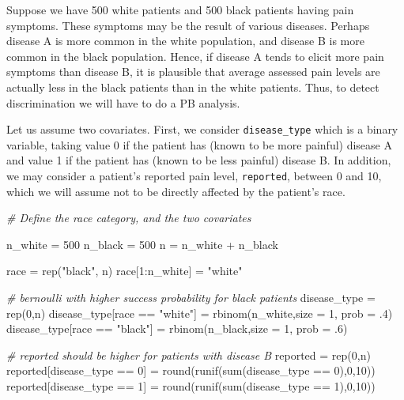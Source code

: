 \documentclass[
]{article}
\newenvironment{Shaded}{\begin{snugshade}}{\end{snugshade}}
\newcommand{\AttributeTok}[1]{\textcolor[rgb]{0.77,0.63,0.00}{#1}}
\newcommand{\CommentTok}[1]{\textcolor[rgb]{0.56,0.35,0.01}{\textit{#1}}}
\newcommand{\DecValTok}[1]{\textcolor[rgb]{0.00,0.00,0.81}{#1}}
\newcommand{\FunctionTok}[1]{\textcolor[rgb]{0.00,0.00,0.00}{#1}}
\newcommand{\NormalTok}[1]{#1}
\newcommand{\OtherTok}[1]{\textcolor[rgb]{0.56,0.35,0.01}{#1}}
\newcommand{\SpecialCharTok}[1]{\textcolor[rgb]{0.00,0.00,0.00}{#1}}
\newcommand{\StringTok}[1]{\textcolor[rgb]{0.31,0.60,0.02}{#1}}
\begin{document}
Suppose we have 500 white patients and 500 black patients having pain
symptoms. These symptoms may be the result of various diseases. Perhaps
disease A is more common in the white population, and disease B is more
common in the black population. Hence, if disease A tends to elicit more
pain symptoms than disease B, it is plausible that average assessed pain
levels are actually less in the black patients than in the white
patients. Thus, to detect discrimination we will have to do a PB
analysis.

Let us assume two covariates. First, we consider \texttt{disease\_type}
which is a binary variable, taking value 0 if the patient has (known to
be more painful) disease A and value 1 if the patient has (known to be
less painful) disease B. In addition, we may consider a patient's
reported pain level, \texttt{reported}, between 0 and 10, which we will
assume not to be directly affected by the patient's race.

\begin{Shaded}
\begin{Highlighting}[]
\CommentTok{\# Define the race category, and the two covariates}

\NormalTok{n\_white }\OtherTok{=} \DecValTok{500}
\NormalTok{n\_black }\OtherTok{=} \DecValTok{500}
\NormalTok{n }\OtherTok{=}\NormalTok{ n\_white }\SpecialCharTok{+}\NormalTok{ n\_black}

\NormalTok{race }\OtherTok{=} \FunctionTok{rep}\NormalTok{(}\StringTok{"black"}\NormalTok{, n)}
\NormalTok{race[}\DecValTok{1}\SpecialCharTok{:}\NormalTok{n\_white] }\OtherTok{=} \StringTok{"white"}

\CommentTok{\# bernoulli with higher success probability for black patients}
\NormalTok{disease\_type }\OtherTok{=} \FunctionTok{rep}\NormalTok{(}\DecValTok{0}\NormalTok{,n)}
\NormalTok{disease\_type[race }\SpecialCharTok{==} \StringTok{"white"}\NormalTok{] }\OtherTok{=} \FunctionTok{rbinom}\NormalTok{(n\_white,}\AttributeTok{size =} \DecValTok{1}\NormalTok{, }\AttributeTok{prob =}\NormalTok{ .}\DecValTok{4}\NormalTok{)}
\NormalTok{disease\_type[race }\SpecialCharTok{==} \StringTok{"black"}\NormalTok{] }\OtherTok{=} \FunctionTok{rbinom}\NormalTok{(n\_black,}\AttributeTok{size =} \DecValTok{1}\NormalTok{, }\AttributeTok{prob =}\NormalTok{ .}\DecValTok{6}\NormalTok{)}

\CommentTok{\# reported should be higher for patients with disease B}
\NormalTok{reported }\OtherTok{=} \FunctionTok{rep}\NormalTok{(}\DecValTok{0}\NormalTok{,n)}
\NormalTok{reported[disease\_type }\SpecialCharTok{==} \DecValTok{0}\NormalTok{] }\OtherTok{=} \FunctionTok{round}\NormalTok{(}\FunctionTok{runif}\NormalTok{(}\FunctionTok{sum}\NormalTok{(disease\_type }\SpecialCharTok{==} \DecValTok{0}\NormalTok{),}\DecValTok{0}\NormalTok{,}\DecValTok{10}\NormalTok{))}
\NormalTok{reported[disease\_type }\SpecialCharTok{==} \DecValTok{1}\NormalTok{] }\OtherTok{=} \FunctionTok{round}\NormalTok{(}\FunctionTok{runif}\NormalTok{(}\FunctionTok{sum}\NormalTok{(disease\_type }\SpecialCharTok{==} \DecValTok{1}\NormalTok{),}\DecValTok{0}\NormalTok{,}\DecValTok{10}\NormalTok{))}
\end{Highlighting}
\end{Shaded}
\end{document}
